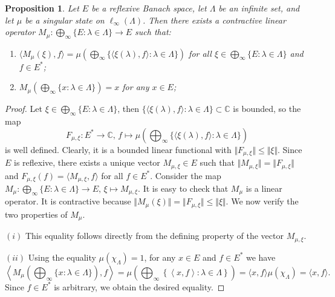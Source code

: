 \documentclass[12pt]{article}
\newtheorem{proposition}[theorem]{Proposition}
\begin{document}
\begin{proposition}\label{EInftyStateByMeanProps} Let $E$ be a reflexive
    Banach space, let $\Lambda$ be an infinite set, and let $\mu$ be a singular 
    state on $\ell_\infty(\Lambda)$. Then there exists a contractive linear 
    operator 
    $
        M_{\mu}:
        \bigoplus\nolimits_\infty\{ E : \lambda\in\Lambda \}\to E
    $
    such that: 
    \begin{enumerate}[label = (\roman*)]
        \item 
            $\langle M_{\mu}(\xi), f\rangle
            =\mu\left(
                \bigoplus_\infty\{ \langle \xi(\lambda), f\rangle: 
                    \lambda\in\Lambda\}
            \right)
            $ for all $\xi\in \bigoplus_\infty\{ E : \lambda\in\Lambda \}$ 
            and $f \in E^*$;
        \item 
            $
            M_{\mu}\left(
                \bigoplus_\infty\{ x: \lambda\in\Lambda\}
            \right) = x
            $ for any $x \in E$;
    \end{enumerate} 
\end{proposition}
\begin{proof} Let $\xi\in \bigoplus_\infty\{ E : \lambda\in\Lambda \}$, 
    then $\{\langle \xi(\lambda), f\rangle:\lambda\in\Lambda\}\subset\mathbb{C}$ 
    is bounded, so the map
    \[
        F_{\mu,\xi}: E^*\to\mathbb{C},\, 
        f\mapsto \mu\left(
            \bigoplus\nolimits_\infty\{\langle \xi(\lambda), f\rangle: 
                \lambda\in\Lambda\}
        \right)
    \]
    is well defined. Clearly, it is a bounded linear functional 
    with $\Vert F_{\mu,\xi}\Vert\leq\Vert \xi\Vert$. Since $E$ is 
    reflexive, there exists a unique vector $M_{\mu,\xi}\in E$ such 
    that $\Vert M_{\mu,\xi}\Vert=\Vert F_{\mu,\xi}\Vert$ 
    and $F_{\mu,\xi}(f)=\langle M_{\mu,\xi}, f\rangle$ 
    for all $f\in E^*$. Consider the map
    $
        M_{\mu}:
        \bigoplus\nolimits_\infty\{ E : \lambda\in\Lambda \}\to E,\, 
        \xi\mapsto M_{\mu,\xi}.
    $
    It is easy to check that $M_{\mu}$ is a linear operator. It is 
    contractive because 
    $
        \Vert M_{\mu}(\xi)\Vert
        =\Vert F_{\mu,\xi}\Vert
        \leq\Vert \xi\Vert.
    $
    We now verify the two properties of $M_{\mu}$.

    $(i)$ This equality follows directly from the defining property of the 
    vector $M_{\mu,\xi}$.

    $(ii)$ Using the equality $\mu(\chi_\Lambda)=1$, for 
    any $x\in E$ and $f\in E^*$ we have 
    \[
        \left\langle M_{\mu}\left(
            \bigoplus\nolimits_\infty\{ x: \lambda\in\Lambda\}
            \right),
            f
        \right\rangle
        =\mu\left(\bigoplus\nolimits_\infty\left\{
            \left\langle x, f\right\rangle:\lambda\in\Lambda
        \right\}\right)
        =\langle x,f \rangle \mu(\chi_{\Lambda})
        =\langle x,f \rangle. 
    \]
    Since $f\in E^*$ is arbitrary, we obtain the desired equality.
\end{proof}
\end{document}
